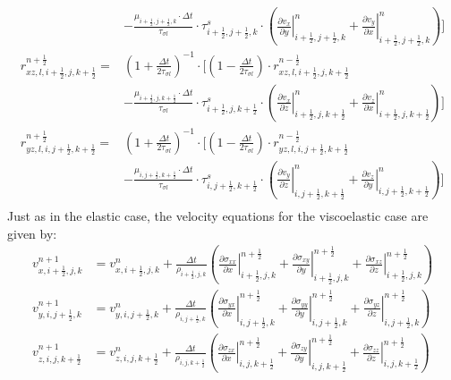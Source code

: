 \documentclass[pdftex,a4paper,parskip,listof=totoc,bibliography=totoc,onehalfspacing,12pt]{scrreprt}
\begin{document}
\begin{align*}
	& -\frac{\mu_{i+\frac{1}{2},j+\frac{1}{2},k}\cdot\Delta t}{\tau_{\sigma l}}\cdot \tau^s_{i+\frac{1}{2},j+\frac{1}{2},k} \cdot \left( \left.\frac{\partial v_x}{\partial y}\right\rvert_{i+\frac{1}{2},j+\frac{1}{2},k}^{n} + \left.\frac{\partial v_y}{\partial x}\right\rvert_{i+\frac{1}{2},j+\frac{1}{2},k}^{n} \right)\Bigg]\\
	r_{xz,l,i+\frac{1}{2},j,k+\frac{1}{2}}^{n+\frac{1}{2}} =& \left( 1+ \frac{\Delta t}{2\tau_{\sigma l}} \right)^{-1}\cdot \Bigg[\left( 1- \frac{\Delta t}{2\tau_{\sigma l}}  \right) \cdot r_{xz,l,i+\frac{1}{2},j,k+\frac{1}{2}}^{n-\frac{1}{2}} \\ 
	& -\frac{\mu_{i+\frac{1}{2},j,k+\frac{1}{2}}\cdot\Delta t}{\tau_{\sigma l}}\cdot \tau^s_{i+\frac{1}{2},j,k+\frac{1}{2}} \cdot \left( \left.\frac{\partial v_x}{\partial z}\right\rvert_{i+\frac{1}{2},j,k+\frac{1}{2}}^{n} + \left.\frac{\partial v_z}{\partial x}\right\rvert_{i+\frac{1}{2},j,k+\frac{1}{2}}^{n} \right)\Bigg]\\
	r_{yz,l,i,j+\frac{1}{2},k+\frac{1}{2}}^{n+\frac{1}{2}} =& \left( 1+ \frac{\Delta t}{2\tau_{\sigma l}} \right)^{-1}\cdot \Bigg[\left( 1- \frac{\Delta t}{2\tau_{\sigma l}}  \right) \cdot r_{yz,l,i,j+\frac{1}{2},k+\frac{1}{2}}^{n-\frac{1}{2}} \\ 
	& -\frac{\mu_{i,j+\frac{1}{2},k+\frac{1}{2}}\cdot\Delta t}{\tau_{\sigma l}}\cdot \tau^s_{i,j+\frac{1}{2},k+\frac{1}{2}} \cdot \left( \left.\frac{\partial v_y}{\partial z}\right\rvert_{i,j+\frac{1}{2},k+\frac{1}{2}}^{n} + \left.\frac{\partial v_z}{\partial y}\right\rvert_{i,j+\frac{1}{2},k+\frac{1}{2}}^{n} \right)\Bigg] \\
\end{align*}
Just as in the elastic case, the velocity equations for the viscoelastic case are given by:
\begin{align*}
	v_{x,i+\frac{1}{2},j,k}^{n+1} &= v_{x,i+\frac{1}{2},j,k}^n + \frac{\Delta t}{\rho_{i+\frac{1}{2},j,k}}  \left( \left.\frac{\partial\sigma_{xx}}{\partial x}\right\rvert_{i+\frac{1}{2},j,k}^{n+\frac{1}{2}} + \left.\frac{\partial\sigma_{xy}}{\partial y}\right\rvert_{i+\frac{1}{2},j,k}^{n+\frac{1}{2}} + \left.\frac{\partial\sigma_{xz}}{\partial z}\right\rvert_{i+\frac{1}{2},j,k}^{n+\frac{1}{2}} \right)\\
	v_{y,i,j+\frac{1}{2},k}^{n+1} &= v_{y,i,j+\frac{1}{2},k}^n + \frac{\Delta t}{\rho_{i,j+\frac{1}{2},k}}  \left( \left.\frac{\partial\sigma_{yx}}{\partial x}\right\rvert_{i,j+\frac{1}{2},k}^{n+\frac{1}{2}} + \left.\frac{\partial\sigma_{yy}}{\partial y}\right\rvert_{i,j+\frac{1}{2},k}^{n+\frac{1}{2}} + \left.\frac{\partial\sigma_{yz}}{\partial z}\right\rvert_{i,j+\frac{1}{2},k}^{n+\frac{1}{2}} \right)\\
	v_{z,i,j,k+\frac{1}{2}}^{n+1} &= v_{z,i,j,k+\frac{1}{2}}^n + \frac{\Delta t}{\rho_{i,j,k+\frac{1}{2}}}  \left( \left.\frac{\partial\sigma_{zx}}{\partial x}\right\rvert_{i,j,k+\frac{1}{2}}^{n+\frac{1}{2}} + \left.\frac{\partial\sigma_{zy}}{\partial y}\right\rvert_{i,j,k+\frac{1}{2}}^{n+\frac{1}{2}} + \left.\frac{\partial\sigma_{zz}}{\partial z}\right\rvert_{i,j,k+\frac{1}{2}}^{n+\frac{1}{2}} \right)
\end{align*}
\end{document}

